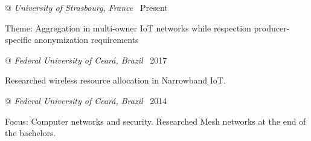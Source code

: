 
 @ \textit{University of Strasbourg, France}
\dotfill {} \textemdash\  Present

{\small \enspace Theme: Aggregation in multi-owner IoT networks while respection producer-specific anonymization requirements}


\smallskip


 @ \textit{Federal University of Ceará, Brazil}
\dotfill {} \textemdash\  2017

{\small \enspace Researched wireless resource allocation in Narrowband IoT.}


\smallskip


 @ \textit{Federal University of Ceará, Brazil}
\dotfill {} \textemdash\  2014

{\small \enspace Focus: Computer networks and security. Researched Mesh networks at the end of the bachelors.}
